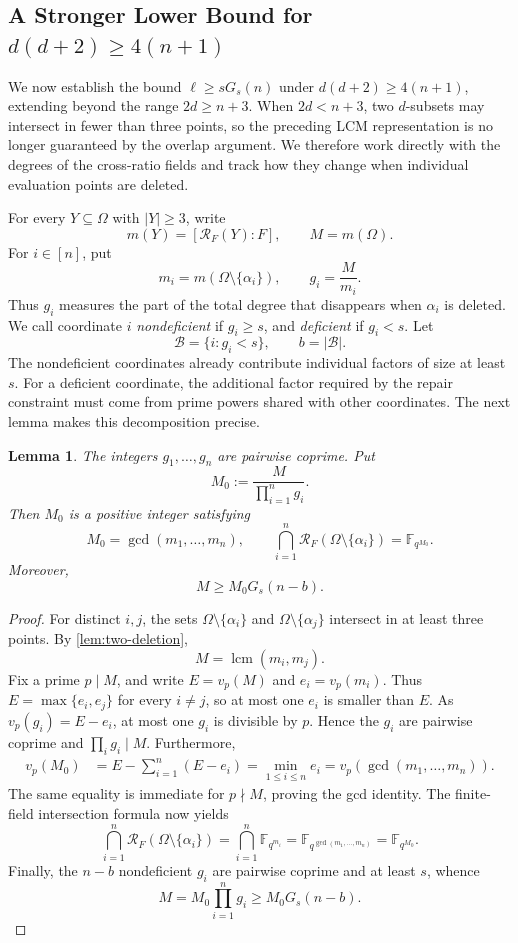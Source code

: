 \documentclass[11pt,onecolumn]{IEEEtran}
\newtheorem{lemma}{Lemma}
\newcommand{\lcmop}{\operatorname{lcm}}
\newcommand{\crf}{\mathscr R}
\begin{document}
\subsection{A Stronger Lower Bound for \texorpdfstring{$d(d+2)\geq 4(n+1)$}{d(d+2) >= 4(n+1)}}
\label{subsec:quadratic-lower}

We now establish the bound $\ell\ge sG_s(n)$ under
$d(d+2)\geq 4(n+1)$, extending beyond the range $2d\geq n+3$.
When $2d<n+3$, two $d$-subsets may intersect in fewer than three
points, so the preceding LCM representation is no longer guaranteed
by the overlap argument.  We therefore work directly with the degrees
of the cross-ratio fields and track how they change when individual
evaluation points are deleted.

For every $Y\subseteq\Omega$ with $|Y|\ge3$, write
\[
m(Y)=[\crf_F(Y):F],
\qquad
M=m(\Omega).
\]
For $i\in[n]$, put
\[
m_i=m(\Omega\setminus\{\alpha_i\}),
\qquad
g_i=\frac{M}{m_i}.
\]
Thus $g_i$ measures the part of the total degree that disappears when
$\alpha_i$ is deleted.  We call coordinate $i$ \emph{nondeficient} if
$g_i\ge s$, and \emph{deficient} if $g_i<s$.  Let
\[
\mathcal B=\{i:g_i<s\},
\qquad
b=|\mathcal B|.
\]
The nondeficient coordinates already contribute individual factors of
size at least $s$.  For a deficient coordinate, the additional factor
required by the repair constraint must come from prime powers shared
with other coordinates.  The next lemma makes this decomposition
precise.

\begin{lemma}
\label{lem:private-factorization}
The integers $g_1,\ldots,g_n$ are pairwise coprime.  Put
\[
M_0:=\frac{M}{\prod_{i=1}^n g_i}.
\]
Then $M_0$ is a positive integer satisfying
\[
M_0=\gcd(m_1,\ldots,m_n),\qquad
\bigcap_{i=1}^n\crf_F(\Omega\setminus\{\alpha_i\})
=\mathbb F_{q^{M_0}}.
\]
Moreover,
\begin{equation}
M\ge M_0G_s(n-b).
\label{eq:private-factor-lower}
\end{equation}
\end{lemma}

\begin{proof}
For distinct $i,j$, the sets $\Omega\setminus\{\alpha_i\}$
and $\Omega\setminus\{\alpha_j\}$ intersect in at least
three points.  By \cref{lem:two-deletion},
\[
M=\lcmop(m_i,m_j).
\]
Fix a prime $p\mid M$, and write
$E=v_p(M)$ and $e_i=v_p(m_i)$.  Thus
$E=\max\{e_i,e_j\}$ for every $i\ne j$, so at most one $e_i$ is
smaller than $E$.  As $v_p(g_i)=E-e_i$, at most one $g_i$ is divisible
by $p$.  Hence the $g_i$ are pairwise coprime and
$\prod_i g_i\mid M$.  Furthermore,
\[
\begin{aligned}
v_p(M_0)
&=E-\sum_{i=1}^n(E-e_i)
=\min_{1\le i\le n}e_i
=v_p(\gcd(m_1,\ldots,m_n)).
\end{aligned}
\]
The same equality is immediate for $p\nmid M$, proving the gcd
identity.  The finite-field intersection formula now yields
\[\bigcap_{i=1}^n\crf_F(\Omega\setminus\{\alpha_i\})
=\bigcap_{i=1}^n\mathbb F_{q^{m_i}}=\mathbb F_{q^{\gcd(m_1,\ldots,m_n)}}
=\mathbb F_{q^{M_0}}.
\]
Finally, the $n-b$ nondeficient $g_i$ are
pairwise coprime and at least $s$, whence
\[
M=M_0\prod_{i=1}^n g_i
\ge M_0G_s(n-b).
\]
\end{proof}
\end{document}
